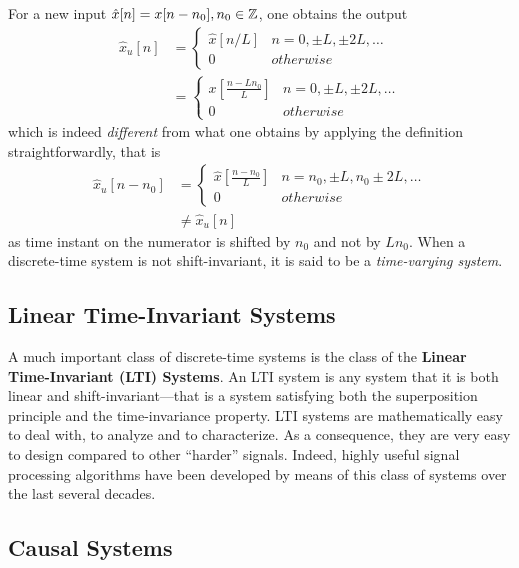 \documentclass[\documentfontsize, twocolumn]{\classname}
\begin{document}
For a new input $\hat x[n] = x[n-n_0], n_0 \in \mathbb Z$, one obtains the output
\begin{align*}
    \hat x_u[n] &=
	\left\{
		\begin{array}{ll}
			\hat x[n/L] 	& n=0,\pm L, \pm 2L, \dots \\
			0 	& otherwise
		\end{array}
	\right.\\
                &=
    \left\{
		\begin{array}{ll}
            x[\frac{n-Ln_0}{L}] 	& n=0,\pm L, \pm 2L, \dots \\
			0 	& otherwise
		\end{array}
	\right.
\end{align*}
which is indeed \emph{different} from what one obtains by applying the definition straightforwardly, that is
\begin{align*}
    \hat x_u[n-n_0] &=
	\left\{
		\begin{array}{ll}
            \hat x[\frac{n-n_0}{L}] 	& n=n_0,\pm L,n_0 \pm 2L, \dots \\
			0 	& otherwise
		\end{array}
	\right.\\
                    &\neq \hat x_u[n]
\end{align*}
as time instant on the numerator is shifted by $n_0$ and not by $Ln_0$. When a discrete-time system is not shift-invariant, it is said to be a \emph{time-varying system}.

\subsection{Linear Time-Invariant Systems}\label{sec:ltiSystems}

A much important class of discrete-time systems is the class of the \textbf{Linear Time-Invariant (LTI) Systems}. An LTI system is any system that it is both linear and shift-invariant---that is a system satisfying both the superposition principle and the time-invariance property. LTI systems are mathematically easy to deal with, to analyze and to characterize. As a consequence, they are very easy to design compared to other ``harder'' signals. Indeed, highly useful signal processing algorithms have been developed by means of this class of systems over the last several decades.

\subsection{Causal Systems}
\end{document}
